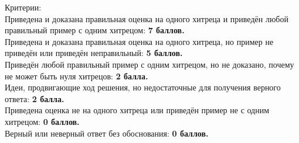 Критерии:\\
Приведена и доказана правильная оценка на одного хитреца и приведён любой правильный пример с одним хитрецом: \textbf{7 баллов.}\\
Приведена и доказана правильная оценка на одного хитреца, но пример не приведён или приведён неправильный: \textbf{5 баллов.}\\
Приведён любой правильный пример с одним хитрецом, но не доказано, почему не может быть нуля хитрецов: \textbf{2 балла.}\\
Идеи, продвигающие ход решения, но недостаточные для получения верного ответа: \textbf{2 балла.}\\
Приведена оценка не на одного хитреца или приведён пример не с одним хитрецом: \textbf{0 баллов.}\\
Верный или неверный ответ без обоснования: \textbf{0 баллов.}
















